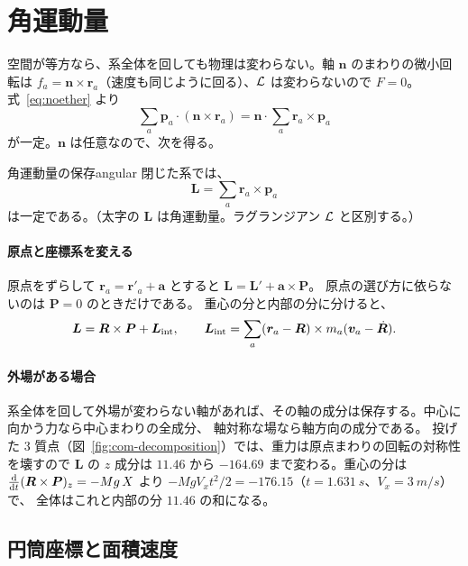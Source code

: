 \section{角運動量}\label{sec:cons-angular}

空間が等方なら、系全体を回しても物理は変わらない。軸 $\bm n$ のまわりの微小回転は
$f_a=\bm n\times\bm r_a$（速度も同じように回る）、$\mathcal{L}$ は変わらないので $F=0$。式~\eqref{eq:noether} より
\begin{equation}
  \sum_a\bm p_a\cdot(\bm n\times\bm r_a)=\bm n\cdot\sum_a\bm r_a\times\bm p_a
\end{equation}
が一定。$\bm n$ は任意なので、次を得る。

\begin{result}{角運動量の保存}{angular}
閉じた系では、
\begin{equation}
  \bm L=\sum_a\bm r_a\times\bm p_a
\end{equation}
は一定である。（太字の $\bm L$ は角運動量。ラグランジアン $\mathcal{L}$ と区別する。）
\end{result}

\paragraph{原点と座標系を変える}
原点をずらして $\bm r_a=\bm r'_a+\bm a$ とすると $\bm L=\bm L'+\bm a\times\bm P$。
原点の選び方に依らないのは $\bm P=0$ のときだけである。
重心の分と内部の分に分けると、
\begin{equation}
  \bm L=\bm R\times\bm P+\bm L_{\rm int},\qquad
  \bm L_{\rm int}=\sum_a(\bm r_a-\bm R)\times m_a(\bm v_a-\dot{\bm R}).
\end{equation}

\paragraph{外場がある場合}
系全体を回して外場が変わらない軸があれば、その軸の成分は保存する。中心に向かう力なら中心まわりの全成分、
軸対称な場なら軸方向の成分である。
投げた 3 質点（図~\ref{fig:com-decomposition}）では、重力は原点まわりの回転の対称性を壊すので
$\bm L$ の $z$ 成分は $11.46$ から $-164.69$ まで変わる。重心の分は
$\frac{\mathrm{d} }{\mathrm{d} t}(\bm R\times\bm P)_z=-Mg\,X$ より $-MgV_xt^2/2=-176.15$（$t=\qty{1.631}{s}$、$V_x=\qty{3}{m/s}$）で、
全体はこれと内部の分 $11.46$ の和になる。

\subsection*{円筒座標と面積速度}

